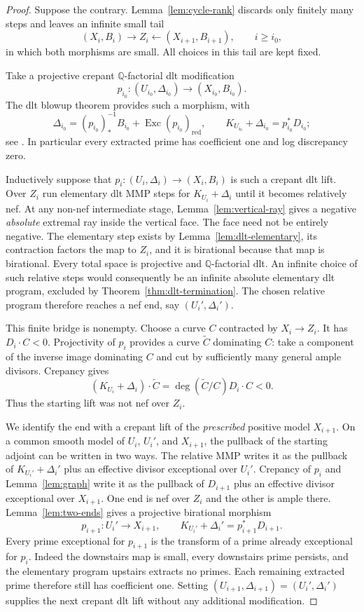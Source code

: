 \begin{proof}
Suppose the contrary.  Lemma~\ref{lem:cycle-rank} discards only
finitely many steps and leaves an infinite small tail
\[
 (X_i,B_i)\longrightarrow Z_i\longleftarrow(X_{i+1},B_{i+1}),
 \qquad i\ge i_0,
\]
in which both morphisms are small.  All choices in this tail are
kept fixed.

Take a projective crepant $\mathbb Q$-factorial dlt modification
\[
 p_{i_0}:(U_{i_0},\Delta_{i_0})\longrightarrow(X_{i_0},B_{i_0}).
\]
The dlt blowup theorem provides such a morphism, with
\[
 \Delta_{i_0}=(p_{i_0})_*^{-1}B_{i_0}
                   +\operatorname{Exc}(p_{i_0})_{\mathrm{red}},
 \qquad
 K_{U_{i_0}}+\Delta_{i_0}=p_{i_0}^*D_{i_0};
\]
see \cite[Theorem~10.4]{FujinoFoundations}.  In particular every
extracted prime has coefficient one and log discrepancy zero.

Inductively suppose that $p_i:(U_i,\Delta_i)\to(X_i,B_i)$ is such
a crepant dlt lift.  Over $Z_i$ run elementary dlt MMP steps for
$K_{U_i}+\Delta_i$ until it becomes relatively nef.  At any non-nef
intermediate stage,
Lemma~\ref{lem:vertical-ray} gives a negative \emph{absolute}
extremal ray inside the vertical face.  The face need not be
entirely negative.  The elementary step exists by
Lemma~\ref{lem:dlt-elementary}, its contraction factors the map
to $Z_i$, and it is birational because that map is birational.
Every total space is projective and $\mathbb Q$-factorial dlt.
An infinite choice of such relative steps would consequently be
an infinite absolute elementary dlt program, excluded by
Theorem~\ref{thm:dlt-termination}.  The chosen relative program
therefore reaches a nef end, say $(U_i',\Delta_i')$.

This finite bridge is nonempty.  Choose a curve $C$ contracted by
$X_i\to Z_i$.  It has $D_i\cdot C<0$.  Projectivity of $p_i$
provides a curve $\widetilde C$ dominating $C$: take a component
of the inverse image dominating $C$ and cut by sufficiently many
general ample divisors.  Crepancy gives
\[
 (K_{U_i}+\Delta_i)\cdot\widetilde C
     =\deg(\widetilde C/C)D_i\cdot C<0.
\]
Thus the starting lift was not nef over $Z_i$.

We identify the end with a crepant lift of the \emph{prescribed}
positive model $X_{i+1}$.  On a common smooth model of $U_i$,
$U_i'$, and $X_{i+1}$, the pullback of the starting adjoint can be
written in two ways.  The relative MMP writes it as the pullback
of $K_{U_i'}+\Delta_i'$ plus an effective divisor exceptional over
$U_i'$.  Crepancy of $p_i$ and Lemma~\ref{lem:graph} write it as
the pullback of $D_{i+1}$ plus an effective divisor exceptional over
$X_{i+1}$.  One end is nef over $Z_i$ and the other is ample there.
Lemma~\ref{lem:two-ends} gives a projective birational morphism
\[
 p_{i+1}:U_i'\longrightarrow X_{i+1},\qquad
 K_{U_i'}+\Delta_i'=p_{i+1}^*D_{i+1}.
\]
Every prime exceptional for $p_{i+1}$ is the transform of a prime
already exceptional for $p_i$.  Indeed the downstairs map is
small, every downstairs prime persists, and the elementary
program upstairs extracts no primes.  Each remaining extracted
prime therefore still has coefficient one.  Setting
$(U_{i+1},\Delta_{i+1})=(U_i',\Delta_i')$ supplies the next
crepant dlt lift without any additional modification.


\end{proof}

